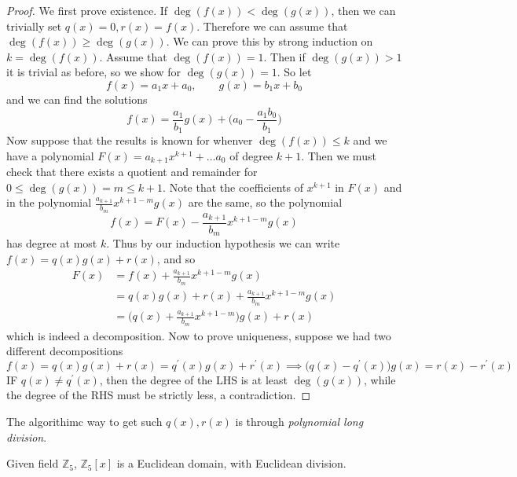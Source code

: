   \begin{proof}
    We first prove existence. If $\deg(f(x)) < \deg(g(x))$, then we can trivially set $q(x) = 0, r(x) = f(x)$. Therefore we can assume that $\deg(f(x)) \geq \deg(g(x))$. We can prove this by strong induction on $k = \deg(f(x))$. Assume that $\deg(f(x)) = 1$. Then if $\deg(g(x)) > 1$ it is trivial as before, so we show for $\deg(g(x)) = 1$. So let 
    \begin{equation}
      f(x) = a_1 x + a_0, \qquad g(x) = b_1 x + b_0 
    \end{equation}
    and we can find the solutions 
    \begin{equation}
      f(x) = \frac{a_1}{b_1} g(x) + \bigg( a_0 - \frac{a_1 b_0}{b_1} \bigg)
    \end{equation} 
    Now suppose that the results is known for whenver $\deg(f(x)) \leq k$ and we have a polynomial $F(x) = a_{k+1} x^{k+1} + \ldots a_0$ of degree $k+1$. Then we must check that there exists a quotient and remainder for $0 \leq \deg(g(x)) = m \leq k + 1$. Note that the coefficients of $x^{k+1}$ in $F(x)$ and in the polynomial $\frac{a_{k+1}}{b_m} x^{k+1-m} g(x)$ are the same, so the polynomial 
    \begin{equation}
      f(x) = F(x) - \frac{a_{k+1}}{b_m} x^{k+1-m} g(x) 
    \end{equation}
    has degree at most $k$. Thus by our induction hypothesis we can write $f(x) = q(x) g(x) + r(x)$, and so 
    \begin{align}
      F(x) & = f(x) + \frac{a_{k+1}}{b_m} x^{k+1-m} g(x) \\
           & = q(x) g(x) + r(x) + \frac{a_{k+1}}{b_m} x^{k+1-m} g(x) \\ 
           & = \bigg( q(x) + \frac{a_{k+1}}{b_m} x^{k+1-m} \bigg) g(x) + r(x)
    \end{align} 
    which is indeed a decomposition. Now to prove uniqueness, suppose we had two different decompositions 
    \begin{equation}
      f(x) = q(x) g(x) + r(x) = q^\prime (x) g(x) + r^\prime (x) \implies \big( q(x) - q^\prime (x) \big) g(x) = r(x) - r^\prime (x)  
    \end{equation}  
    IF $q(x) \neq q^\prime (x)$, then the degree of the LHS is at least $\deg(g(x))$, while the degree of the RHS must be strictly less, a contradiction. 
  \end{proof}

  \begin{example} 
    The algorithimc way to get such $q(x), r(x)$ is through \textit{polynomial long division}. 
    
    \begin{center}
    \end{center}

    Given field $\mathbb{Z}_5$, $\mathbb{Z}_5[x]$ is a Euclidean domain, with Euclidean division.  
  \end{example} 

